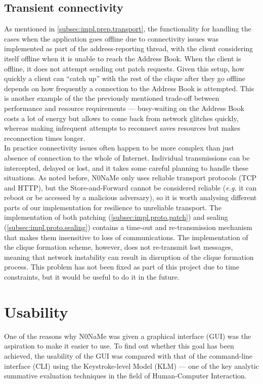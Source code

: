 \documentclass[a4paper, twoside, 12pt]{report}
\newcommand{\funkytt}{\fontfamily{AnonymousPro}\selectfont}
\begin{document}
\subsection{Transient connectivity}
As mentioned in \cref{subsec:impl.prep.transport}, the functionality for handling the cases when the application goes offline due to connectivity issues was implemented as part of the address-reporting thread, with the client considering itself offline when it is unable to reach the Address Book. When the client is offline, it does not attempt sending out patch requests. Given this setup, how quickly a client can ``catch up'' with the rest of the clique after they go offline depends on how frequently a connection to the Address Book is attempted. This is another example of the the previously mentioned trade-off between performance and resource requirements --- busy-waiting on the Address Book costs a lot of energy but allows to come back from network glitches quickly, whereas making infrequent attempts to reconnect saves resources but makes reconnection times longer. \\


In practice connectivity issues often happen to be more complex than just absence of connection to the whole of Internet. Individual transmissions can be intercepted, delayed or lost, and it takes some careful planning to handle these situations. As noted before, {\funkytt N0NaMe} only uses reliable transport protocols (TCP and HTTP), but the Store-and-Forward cannot be considered reliable (\textit{e.g.} it can reboot or be accessed by a malicious adversary), so it is worth analysing different parts of our implementation for resilience to unreliable transport. The implementation of both patching (\cref{subsec:impl.proto.patch}) and sealing (\cref{subsec:impl.proto.sealing}) contains a time-out and re-transmission mechanism that makes them insensitive to loss of communications. The implementation of the clique formation scheme, however, does not re-transmit lost messages, meaning that network instability can result in disruption of the clique formation process. This problem has not been fixed as part of this project due to time constraints, but it would be useful to do it in the future.

\section{Usability}
\label{sec:eval.usability}
One of the reasons why {\funkytt N0NaMe} was given a graphical interface (GUI) was the aspiration to make it easier to use. To find out whether this goal has been achieved, the usability of the GUI was compared with that of the command-line interface (CLI) using the Keystroke-level Model (KLM) --- one of the key analytic summative evaluation techniques in the field of Human-Computer Interaction. \\
\end{document}
